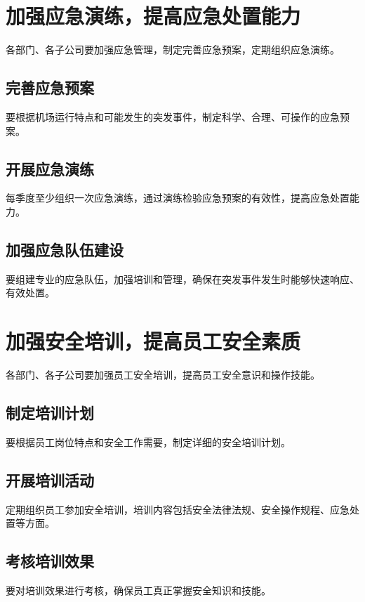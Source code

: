 \documentclass{common-doc}
\begin{document}
\section{加强应急演练，提高应急处置能力}
各部门、各子公司要加强应急管理，制定完善应急预案，定期组织应急演练。

\subsection{完善应急预案}
要根据机场运行特点和可能发生的突发事件，制定科学、合理、可操作的应急预案。

\subsection{开展应急演练}
每季度至少组织一次应急演练，通过演练检验应急预案的有效性，提高应急处置能力。

\subsection{加强应急队伍建设}
要组建专业的应急队伍，加强培训和管理，确保在突发事件发生时能够快速响应、有效处置。

\section{加强安全培训，提高员工安全素质}
各部门、各子公司要加强员工安全培训，提高员工安全意识和操作技能。

\subsection{制定培训计划}
要根据员工岗位特点和安全工作需要，制定详细的安全培训计划。

\subsection{开展培训活动}
定期组织员工参加安全培训，培训内容包括安全法律法规、安全操作规程、应急处置等方面。

\subsection{考核培训效果}
要对培训效果进行考核，确保员工真正掌握安全知识和技能。
\end{document}
